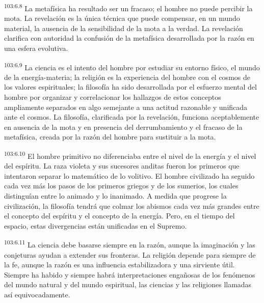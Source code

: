 \documentclass[twoside, 11pt]{book}
\begin{document}
\par
\textsuperscript{103:6.8} La metafísica ha resultado ser un fracaso; el hombre no puede percibir la mota. La revelación es la única técnica que puede compensar, en un mundo material, la ausencia de la sensibilidad de la mota a la verdad. La revelación clarifica con autoridad la confusión de la metafísica desarrollada por la razón en una esfera evolutiva.

\par
\textsuperscript{103:6.9} La ciencia es el intento del hombre por estudiar su entorno físico, el mundo de la energía-materia; la religión es la experiencia del hombre con el cosmos de los valores espirituales; la filosofía ha sido desarrollada por el esfuerzo mental del hombre por organizar y correlacionar los hallazgos de estos conceptos ampliamente separados en algo semejante a una actitud razonable y unificada ante el cosmos. La filosofía, clarificada por la revelación, funciona aceptablemente en ausencia de la mota y en presencia del derrumbamiento y el fracaso de la metafísica, creada por la razón del hombre para sustituir a la mota.

\par
\textsuperscript{103:6.10} El hombre primitivo no diferenciaba entre el nivel de la energía y el nivel del espíritu. La raza violeta y sus sucesores anditas fueron los primeros que intentaron separar lo matemático de lo volitivo. El hombre civilizado ha seguido cada vez más los pasos de los primeros griegos y de los sumerios, los cuales distinguían entre lo animado y lo inanimado. A medida que progrese la civilización, la filosofía tendrá que colmar los abismos cada vez más grandes entre el concepto del espíritu y el concepto de la energía. Pero, en el tiempo del espacio, estas divergencias están unificadas en el Supremo.

\par
\textsuperscript{103:6.11} La ciencia debe basarse siempre en la razón, aunque la imaginación y las conjeturas ayudan a extender sus fronteras. La religión depende para siempre de la fe, aunque la razón es una influencia estabilizadora y una sirviente útil. Siempre ha habido y siempre habrá interpretaciones engañosas de los fenómenos del mundo natural y del mundo espiritual, las ciencias y las religiones llamadas así equivocadamente.
\end{document}
